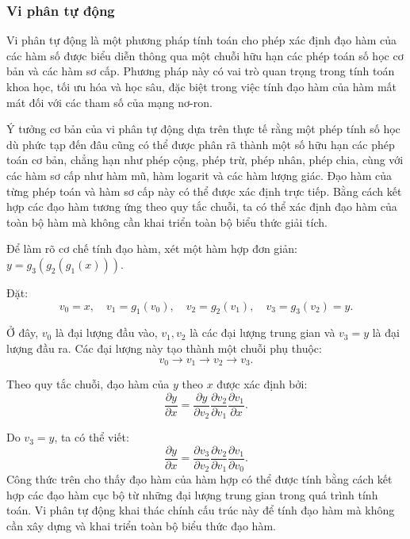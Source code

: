 \subsubsection{Vi phân tự động}
Vi phân tự động là một phương pháp tính toán cho phép xác định đạo hàm của các hàm số được biểu diễn thông qua một chuỗi hữu hạn các phép toán số học cơ bản và các hàm sơ cấp. Phương pháp này có vai trò quan trọng trong tính toán khoa học, tối ưu hóa và học sâu, đặc biệt trong việc tính đạo hàm của hàm mất mát đối với các tham số của mạng nơ-ron.

Ý tưởng cơ bản của vi phân tự động dựa trên thực tế rằng một phép tính số học dù phức tạp đến đâu cũng có thể được phân rã thành một số hữu hạn các phép toán cơ bản, chẳng hạn như phép cộng, phép trừ, phép nhân, phép chia, cùng với các hàm sơ cấp như hàm mũ, hàm logarit và các hàm lượng giác. Đạo hàm của từng phép toán và hàm sơ cấp này có thể được xác định trực tiếp. Bằng cách kết hợp các đạo hàm tương ứng theo quy tắc chuỗi, ta có thể xác định đạo hàm của toàn bộ hàm mà không cần khai triển toàn bộ biểu thức giải tích.

Để làm rõ cơ chế tính đạo hàm, xét một hàm hợp đơn giản:
$y =g_3\!\left(g_2\!\left(g_1(x)\right)\right).$

Đặt:
$$v_0 = x, \quad v_1 = g_1(v_0), \quad v_2 = g_2(v_1), \quad v_3 = g_3(v_2) = y.$$


Ở đây, $v_0$ là đại lượng đầu vào, $v_1, v_2$ là các đại lượng trung gian và $v_3=y$ là đại lượng đầu ra. Các đại lượng này tạo thành một chuỗi phụ thuộc:
\[
v_0 \longrightarrow v_1 \longrightarrow v_2 \longrightarrow v_3.
\]

Theo quy tắc chuỗi, đạo hàm của $y$ theo $x$ được xác định bởi:
\begin{equation}
\frac{\partial y}{\partial x} = \frac{\partial y}{\partial v_2} \frac{\partial v_2}{\partial v_1} \frac{\partial v_1}{\partial x}.
\end{equation}

Do $v_3 = y$, ta có thể viết:
\begin{equation}
\frac{\partial y}{\partial x} = \frac{\partial v_3}{\partial v_2} \frac{\partial v_2}{\partial v_1} \frac{\partial v_1}{\partial v_0}.
\end{equation}
Công thức trên cho thấy đạo hàm của hàm hợp có thể được tính bằng cách kết hợp các đạo hàm cục bộ từ những đại lượng trung gian trong quá trình tính toán. Vi phân tự động khai thác chính cấu trúc này để tính đạo hàm mà không cần xây dựng và khai triển toàn bộ biểu thức đạo hàm.

